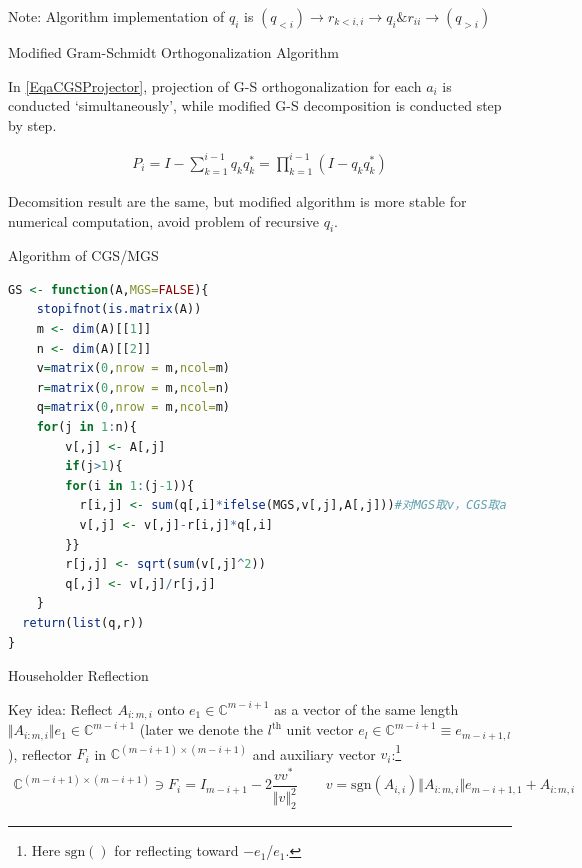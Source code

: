     Note: Algorithm implementation of $ q_i $ is $ (q_{<i})\to r_{k<i,i}\to q_{i}\& r_{ii} \to (q_{>i}) $


\begin{point}
    Modified Gram-Schmidt Orthogonalization Algorithm
\end{point}

    In \autoref{EqaCGSProjector}, projection of G-S orthogonalization for each $ a_i $ is conducted `simultaneously', while modified G-S decomposition is conducted step by step.

\begin{align}
    P_i=I-\sum_{k=1}^{i-1}q_kq_k^*=\prod_{k=1}^{i-1}(I-q_kq_k^*) 
\end{align}
    
    Decomsition result are the same, but modified algorithm is more stable for numerical computation, avoid problem of recursive $ q_i $.


\begin{rcode}
    Algorithm of CGS/MGS
\begin{lstlisting}[language=R]
GS <- function(A,MGS=FALSE){
    stopifnot(is.matrix(A))
    m <- dim(A)[[1]]
    n <- dim(A)[[2]]
    v=matrix(0,nrow = m,ncol=m)
    r=matrix(0,nrow = m,ncol=n)
    q=matrix(0,nrow = m,ncol=m)
    for(j in 1:n){
        v[,j] <- A[,j]
        if(j>1){
        for(i in 1:(j-1)){
          r[i,j] <- sum(q[,i]*ifelse(MGS,v[,j],A[,j]))#对MGS取v，CGS取a
          v[,j] <- v[,j]-r[i,j]*q[,i]
        }}
        r[j,j] <- sqrt(sum(v[,j]^2))
        q[,j] <- v[,j]/r[j,j]
    }
  return(list(q,r))
}
\end{lstlisting}
\end{rcode}






\begin{point}
    \hypertarget{Householder-Reflection}{Householder Reflection}
\end{point}

    Key idea: Reflect $ A_{i:m,i} $ onto $ e_{1}\in\mathbb{C}^{m-i+1} $ as a vector of the same length $ \Vert  A_{i:m,i} \Vert e_{1}\in\mathbb{C}^{m-i+1} $ (later we denote the $ l^\mathrm{th}  $ unit vector $ e_{l}\in\mathbb{C}^{m-i+1}\equiv e_{m-i+1,l} $), reflector $ F_i $ in $ \mathbb{C}^{(m-i+1)\times (m-i+1)} $ and auxiliary vector $ v_i $:\footnote{Here $ \mathrm{sgn}() $ for reflecting toward $ -e_1 $/$ e_1 $.}
    \begin{align}
        \mathbb{C}^{(m-i+1)\times( m-i+1)} \ni F_i=I_{m-i+1}-2\dfrac{vv^*\,}{\Vert v \Vert_2^2 }\qquad v= \mathrm{sgn}(A_{i,i}) \Vert  A_{i:m,i} \Vert e_{m-i+1,1}+ A_{i:m,i} 
    \end{align}

